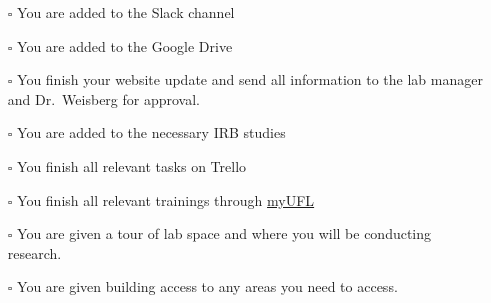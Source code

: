 \documentclass[
  12pt,
]{book}
\providecommand{\tightlist}{%
  \setlength{\itemsep}{0pt}\setlength{\parskip}{0pt}}
\begin{document}
\begin{itemize}
\tightlist
\item[$\square$]
  You are added to the Slack channel
\item[$\square$]
  You are added to the Google Drive
\item[$\square$]
  You finish your website update and send all information to the lab manager and Dr.~Weisberg for approval.
\item[$\square$]
  You are added to the necessary IRB studies
\item[$\square$]
  You finish all relevant tasks on Trello
\item[$\square$]
  You finish all relevant trainings through \href{https://my.ufl.edu/ps/signon.html}{myUFL}
\item[$\square$]
  You are given a tour of lab space and where you will be conducting research.
\item[$\square$]
  You are given building access to any areas you need to access.
\end{itemize}

  
\end{document}
